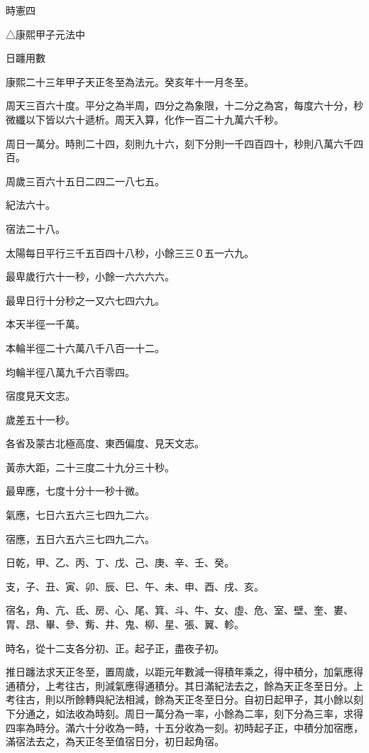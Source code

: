 
\begin{pinyinscope}
時憲四

△康熙甲子元法中

日躔用數

康熙二十三年甲子天正冬至為法元。癸亥年十一月冬至。

周天三百六十度。平分之為半周，四分之為象限，十二分之為宮，每度六十分，秒微纖以下皆以六十遞析。周天入算，化作一百二十九萬六千秒。

周日一萬分。時則二十四，刻則九十六，刻下分則一千四百四十，秒則八萬六千四百。

周歲三百六十五日二四二一八七五。

紀法六十。

宿法二十八。

太陽每日平行三千五百四十八秒，小餘三三０五一六九。

最卑歲行六十一秒，小餘一六六六六。

最卑日行十分秒之一又六七四六九。

本天半徑一千萬。

本輪半徑二十六萬八千八百一十二。

均輪半徑八萬九千六百零四。

宿度見天文志。

歲差五十一秒。

各省及蒙古北極高度、東西偏度、見天文志。

黃赤大距，二十三度二十九分三十秒。

最卑應，七度十分十一秒十微。

氣應，七日六五六三七四九二六。

宿應，五日六五六三七四九二六。

日乾，甲、乙、丙、丁、戊、己、庚、辛、壬、癸。

支，子、丑、寅、卯、辰、巳、午、未、申、酉、戌、亥。

宿名，角、亢、氐、房、心、尾、箕、斗、牛、女、虛、危、室、壁、奎、婁、胃、昂、畢、參、觜、井、鬼、柳、星、張、翼、軫。

時名，從十二支各分初、正。起子正，盡夜子初。

推日躔法求天正冬至，置周歲，以距元年數減一得積年乘之，得中積分，加氣應得通積分，上考往古，則減氣應得通積分。其日滿紀法去之，餘為天正冬至日分。上考往古，則以所餘轉與紀法相減，餘為天正冬至日分。自初日起甲子，其小餘以刻下分通之，如法收為時刻。周日一萬分為一率，小餘為二率，刻下分為三率，求得四率為時分。滿六十分收為一時，十五分收為一刻。初時起子正，中積分加宿應，滿宿法去之，為天正冬至值宿日分，初日起角宿。


\end{pinyinscope}
